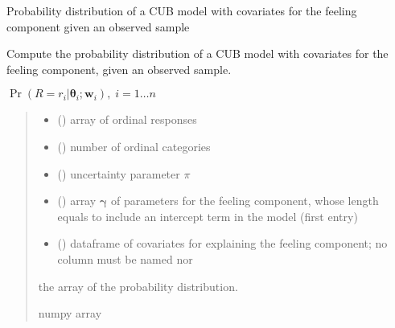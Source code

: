 \documentclass[letterpaper,10pt,english]{sphinxmanual}
\begin{document}

\begin{fulllineitems}
\label{\detokenize{cubmods:cubmods.cub_0w.prob}}
\pysigstartsignatures
{}
\pysigstopsignatures
\sphinxAtStartPar
Probability distribution of a CUB model with covariates for the feeling component
given an observed sample

\sphinxAtStartPar
Compute the probability distribution of a CUB model with covariates
for the feeling component, given an observed sample.

\sphinxAtStartPar
\(\Pr(R = r_i | \pmb\theta_i ; \pmb w_i),\; i=1 \ldots n\)
\begin{quote}\begin{description}
\begin{itemize}
\item {} 
\sphinxAtStartPar
{} () \textendash{} array of ordinal responses

\item {} 
\sphinxAtStartPar
{} () \textendash{} number of ordinal categories

\item {} 
\sphinxAtStartPar
{} () \textendash{} uncertainty parameter \(\pi\)

\item {} 
\sphinxAtStartPar
{} () \textendash{} array \(\pmb \gamma\) of parameters for the feeling component, whose length equals 
 to include an intercept term in the model (first entry)

\item {} 
\sphinxAtStartPar
{} () \textendash{} dataframe of covariates for explaining the feeling component;
no column must be named  nor 

\end{itemize}

\sphinxAtStartPar
the array of the probability distribution.

\sphinxAtStartPar
numpy array

\end{description}\end{quote}

\end{fulllineitems}
\end{document}
